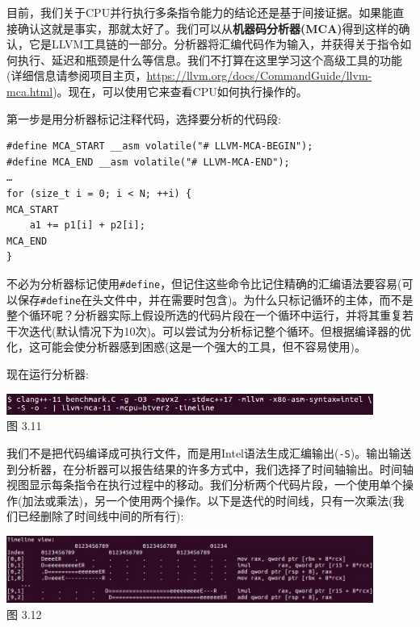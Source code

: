 目前，我们关于CPU并行执行多条指令能力的结论还是基于间接证据。如果能直接确认这就是事实，那就太好了。我们可以从\textbf{机器码分析器(MCA)}得到这样的确认，它是LLVM工具链的一部分。分析器将汇编代码作为输入，并获得关于指令如何执行、延迟和瓶颈是什么等信息。我们不打算在这里学习这个高级工具的功能(详细信息请参阅项目主页，\url{https://llvm.org/docs/CommandGuide/llvm-mca.html})。现在，可以使用它来查看CPU如何执行操作的。

第一步是用分析器标记注释代码，选择要分析的代码段:

\begin{lstlisting}[style=styleCXX]
#define MCA_START __asm volatile("# LLVM-MCA-BEGIN");
#define MCA_END __asm volatile("# LLVM-MCA-END");
…
for (size_t i = 0; i < N; ++i) {
MCA_START
	a1 += p1[i] + p2[i];
MCA_END
}
\end{lstlisting}

不必为分析器标记使用\texttt{\#define}，但记住这些命令比记住精确的汇编语法要容易(可以保存\texttt{\#define}在头文件中，并在需要时包含)。为什么只标记循环的主体，而不是整个循环呢？分析器实际上假设所选的代码片段在一个循环中运行，并将其重复若干次迭代(默认情况下为10次)。可以尝试为分析标记整个循环。但根据编译器的优化，这可能会使分析器感到困惑(这是一个强大的工具，但不容易使用)。

现在运行分析器:

\begin{center}
\includegraphics[width=0.9\textwidth]{content/1/chapter3/images/11.jpg}\\
图 3.11
\end{center}

我们不是把代码编译成可执行文件，而是用Intel语法生成汇编输出(\texttt{-S})。输出输送到分析器，在分析器可以报告结果的许多方式中，我们选择了时间轴输出。时间轴视图显示每条指令在执行过程中的移动。我们分析两个代码片段，一个使用单个操作(加法或乘法)，另一个使用两个操作。以下是迭代的时间线，只有一次乘法(我们已经删除了时间线中间的所有行):

\begin{center}
\includegraphics[width=0.9\textwidth]{content/1/chapter3/images/12.jpg}\\
图 3.12
\end{center}

